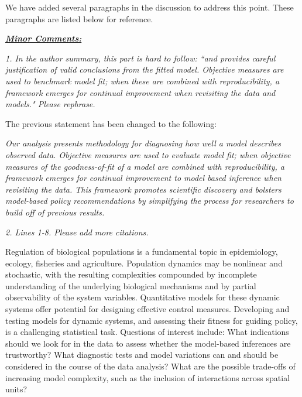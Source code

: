\documentclass[11pt]{article}
\newcommand\report[1]{{\color{mygreen} \vspace{1mm}\hspace{0.25in}\parbox{6in}{\em #1}}}
\newcommand\article[1]{{\color{blue} \vspace{1mm}\hspace{0.25in}\parbox{6in}{\em #1}}}
\begin{document}
We have added several paragraphs in the discussion to address this point. These paragraphs are listed below for reference.

\article{\editDiscussionOne}

\article{\editDiscussionTwo}

\article{\editDiscussionThree}

\article{\editDiscussionFour}

\article{\editDiscussionFive}

\report{
  \textbf{\underline{Minor Comments:}}
}

\report{
  1. In the author summary, this part is hard to follow: ``and provides careful justification of valid conclusions from the fitted model. Objective measures are used to benchmark model fit; when these are combined with reproducibility, a framework emerges for continual improvement when revisiting the data and models." Please rephrase.
}

The previous statement has been changed to the following: 

\article{Our analysis presents methodology for diagnosing how well a model describes observed data. Objective measures are used to evaluate model fit; when objective measures of the goodness-of-fit of a model are combined with reproducibility, a framework emerges for continual improvement to model based inference when revisiting the data. This framework promotes scientific discovery and bolsters model-based policy recommendations by simplifying the process for researchers to build off of previous results.}

\report{
  2. Lines 1-8. Please add more citations.
}


Regulation of biological populations is a fundamental topic in epidemiology, ecology, fisheries and agriculture.
Population dynamics may be nonlinear and stochastic, with the resulting complexities compounded by incomplete understanding of the underlying biological mechanisms and by partial observability of the system variables.
Quantitative models for these dynamic systems offer potential for designing effective control measures.
Developing and testing models for dynamic systems, and assessing their fitness for guiding policy, is a challenging statistical task.
Questions of interest include: What indications should we look for in the data to assess whether the model-based inferences are trustworthy?
What diagnostic tests and model variations can and should be considered in the course of the data analysis?
What are the possible trade-offs of increasing model complexity, such as the inclusion of interactions across spatial units?
\end{document}
